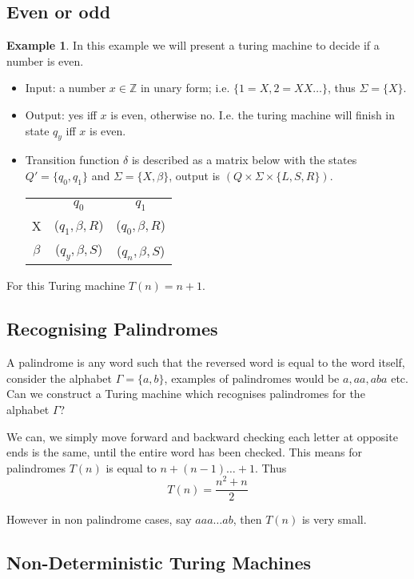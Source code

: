 \documentclass{article}
\theoremstyle{definition}
\newtheorem{example}{Example}[section]
\begin{document}
\subsection{Even or odd}
\begin{example}
	In this example we will present a turing machine to decide if a number is even.
	\begin{itemize}
		\item Input: a number $x \in \mathbb{Z}$ in unary form; i.e. $\{1 = X, 2 = XX\dots\}$,
			thus $\Sigma = \{X\}$.
		\item Output: yes iff $x$ is even, otherwise no. I.e. the turing machine will finish
			in state $q_y$ iff $x$ is even.
		\item Transition function $\delta$ is described as a matrix below with the states
			$Q\prime = \{q_0,q_1\}$ and $\Sigma = \{X,\beta\}$,
			output is $(Q \times \Sigma \times \{L,S,R\})$.
		\begin{center}
			\begin{tabular}{ c c c }
					 & $q_0$           & $q_1$           \\
				X    & ($q_1,\beta,R$) & ($q_0,\beta,R$) \\
			 $\beta$ & ($q_y,\beta,S$) & ($q_n,\beta,S$) \\
			\end{tabular}
		\end{center}
	\end{itemize}
	For this Turing machine $T(n) = n + 1$.
\end{example}

\subsection{Recognising Palindromes}

A palindrome is any word such that the reversed word is equal to the word itself,
consider the alphabet $\Gamma = \{a,b\}$, examples of palindromes would be $a, aa, aba$ etc.
Can we construct a Turing machine which recognises palindromes for the alphabet $\Gamma$?

We can, we simply move forward and backward checking each letter at opposite ends is the same,
until the entire word has been checked.
This means for palindromes $T(n)$ is equal to $n + (n - 1) \dots + 1$. Thus
$$T(n) = \frac{n^2 + n}{2}$$

However in non palindrome cases, say $aaa \dots ab$, then $T(n)$ is very small.

\subsection{Non-Deterministic Turing Machines}
\end{document}
